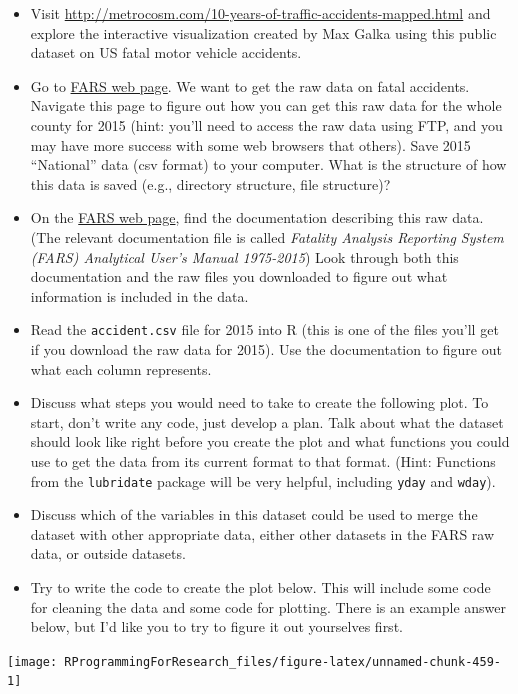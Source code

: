 \documentclass[]{book}
\providecommand{\tightlist}{%
  \setlength{\itemsep}{0pt}\setlength{\parskip}{0pt}}
\theoremstyle{definition}
\theoremstyle{definition}
\theoremstyle{definition}
\theoremstyle{remark}
\begin{document}
\begin{itemize}
\tightlist
\item
  Visit
  \url{http://metrocosm.com/10-years-of-traffic-accidents-mapped.html}
  and explore the interactive visualization created by Max Galka using
  this public dataset on US fatal motor vehicle accidents.
\item
  Go to \href{http://www.nhtsa.gov/FARS}{FARS web page}. We want to get
  the raw data on fatal accidents. Navigate this page to figure out how
  you can get this raw data for the whole county for 2015 (hint: you'll
  need to access the raw data using FTP, and you may have more success
  with some web browsers that others). Save 2015 ``National'' data (csv
  format) to your computer. What is the structure of how this data is
  saved (e.g., directory structure, file structure)?
\item
  On the \href{http://www.nhtsa.gov/FARS}{FARS web page}, find the
  documentation describing this raw data. (The relevant documentation
  file is called \emph{Fatality Analysis Reporting System (FARS)
  Analytical User's Manual 1975-2015}) Look through both this
  documentation and the raw files you downloaded to figure out what
  information is included in the data.
\item
  Read the \texttt{accident.csv} file for 2015 into R (this is one of
  the files you'll get if you download the raw data for 2015). Use the
  documentation to figure out what each column represents.
\item
  Discuss what steps you would need to take to create the following
  plot. To start, don't write any code, just develop a plan. Talk about
  what the dataset should look like right before you create the plot and
  what functions you could use to get the data from its current format
  to that format. (Hint: Functions from the \texttt{lubridate} package
  will be very helpful, including \texttt{yday} and \texttt{wday}).
\item
  Discuss which of the variables in this dataset could be used to merge
  the dataset with other appropriate data, either other datasets in the
  FARS raw data, or outside datasets.
\item
  Try to write the code to create the plot below. This will include some
  code for cleaning the data and some code for plotting. There is an
  example answer below, but I'd like you to try to figure it out
  yourselves first.
\end{itemize}

\begin{center}\texttt{[image: RProgrammingForResearch\_files/figure-latex/unnamed-chunk-459-1]} \end{center}
\end{document}
